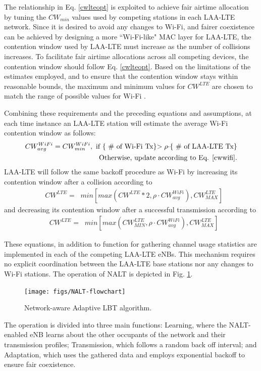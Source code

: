The relationship in Eq. \ref{cwlteopt} is exploited to achieve fair airtime allocation by tuning the $CW_{min}$ values used by competing stations in each \mbox{LAA-LTE} network.  Since it is desired to avoid any changes to \mbox{\mbox{Wi-Fi}}, and fairer coexistence can be achieved by designing a more \mbox{``\mbox{\mbox{Wi-Fi}}-like"} MAC layer for \mbox{\mbox{LAA-LTE}}, the contention window used by \mbox{\mbox{LAA-LTE}} must increase as the number of collisions increases.  To facilitate fair airtime allocations across all competing devices, the contention window should follow Eq. \ref{cwlteopt}.  Based on the limitations of the estimates employed, and to ensure that the contention window stays within reasonable bounds, the maximum and minimum values for $CW^{LTE}$ are chosen to match the range of possible values for \mbox{\mbox{Wi-Fi}} \cite{80211}.  

Combining these requirements and the preceding equations and assumptions, at each time instance an \mbox{\mbox{LAA-LTE}} station will estimate the average \mbox{\mbox{Wi-Fi}} contention window as follows:
\begin{align}
CW^{WiFi}_{avg} = CW^{WiFi}_{min}, \text{  if \{ \# of \mbox{\mbox{Wi-Fi}} Tx\}$> \rho\cdot$\{  \# of \mbox{\mbox{LAA-LTE}} Tx\}}\notag\\ 
\text{Otherwise, update according to Eq. \ref{cwwifi}.}
\end{align}
\mbox{\mbox{LAA-LTE}} will follow the same backoff procedure as \mbox{\mbox{Wi-Fi}} by increasing its contention window after a collision according to
\begin{align}
&CW^{LTE}=\;\;min\left[max\left(CW^{LTE}*2,\rho \cdot CW^{WiFi}_{avg}\right), CW^{LTE}_{MAX}\right]
\end{align}
and decreasing its contention window after a successful transmission according to 
\begin{align}
&CW^{LTE}=\;\;min\left[max\left(CW^{LTE}_{MIN},\rho \cdot CW^{WiFi}_{avg}\right), CW^{LTE}_{MAX}\right]
\end{align}

These equations, in addition to function for gathering channel usage statistics are implemented in each of the competing \mbox{LAA-LTE} eNBs.  This mechanism requires no explicit coordination between the \mbox{LAA-LTE} base stations nor any changes to \mbox{Wi-Fi} stations. The operation of NALT is depicted in Fig. \ref{NALT-flowchart}. 
\begin{figure}[!ht]
	\centering
	\texttt{[image: figs/NALT-flowchart]}
	\caption{Network-aware Adaptive LBT algorithm.}
	\label{NALT-flowchart}
\end{figure}%
The operation is divided into three main functions: Learning, where the NALT-enabled eNB learns about the other occupants of the network and their transmission profiles; Transmission, which follows a random back off interval; and Adaptation, which uses the gathered data and employs exponential backoff to ensure fair coexistence.


